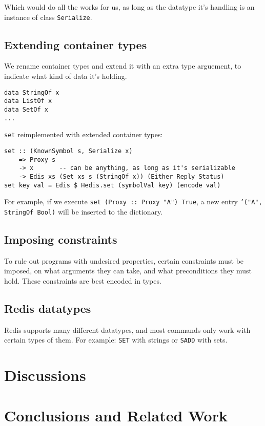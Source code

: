 \documentclass[pldi]{sigplanconf-pldi16}
\begin{document}
Which would do all the works for us, as long as the datatype it's handling is
an instance of class \texttt{Serialize}.\footnotemark

\subsection{Extending container types}
We rename container types and extend it with an extra type arguement,
to indicate what kind of data it's holding.

\begin{verbatim}
data StringOf x
data ListOf x
data SetOf x
...
\end{verbatim}

\texttt{set} reimplemented with extended container types:

\begin{verbatim}
set :: (KnownSymbol s, Serialize x)
    => Proxy s
    -> x       -- can be anything, as long as it's serializable
    -> Edis xs (Set xs s (StringOf x)) (Either Reply Status)
set key val = Edis $ Hedis.set (symbolVal key) (encode val)
\end{verbatim}

For example, if we execute \texttt{set (Proxy :: Proxy "A") True},
a new entry \texttt{'}\texttt{("A", StringOf Bool)} will
be inserted to the dictionary.





\subsection{Imposing constraints}

To rule out programs with undesired properties, certain constraints must be
imposed, on what arguments they can take, and what preconditions they must hold.
These constraints are best encoded in types.

\subsection{Redis datatypes}

Redis supports many different datatypes, and most commands only work with
certain types of them. For example: \texttt{SET} with strings or
\texttt{SADD} with sets.






\section{Discussions}
\section{Conclusions and Related Work}




\end{document}
